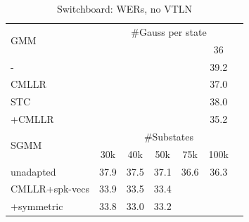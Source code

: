 \documentclass{article}
\begin{document}
\begin{table}[h]
 \renewcommand\arraycolsep{-0.1in}
  \begin{tabular}{|l|cccccc|}           \hline 
 \multirow{2}{*}{GMM}
            &     \multicolumn{6}{c|}{\#Gauss per state}     \\
            &       &        &       &        &   36    &         \\  \cline{2-7}
 -          &       &        &       &        &  39.2   &        \\  
 CMLLR      &       &        &       &        &  37.0   &        \\
 STC        &       &        &       &        &  38.0   &        \\
 +CMLLR     &       &        &       &        &  35.2   &         \\ \hline
 \multirow{2}{*}{SGMM} 
            &    \multicolumn{6}{c|}{\#Substates}                      \\
            & 30k   &  40k  &   50k  &  75k   &  100k  &         \\  \cline{2-7}
 unadapted  &  37.9 & 37.5  &  37.1  & 36.6   &  36.3  &          \\ \hline
CMLLR+spk-vecs&33.9 & 33.5  &  33.4  &        &        &          \\
 +symmetric & 33.8  & 33.0  &  33.2  &        &        &          \\ \hline
  \end{tabular}
   \caption{Switchboard: WERs, no VTLN}
 \label{tab:switchboard:novtln}
\end{table}



\end{document}
